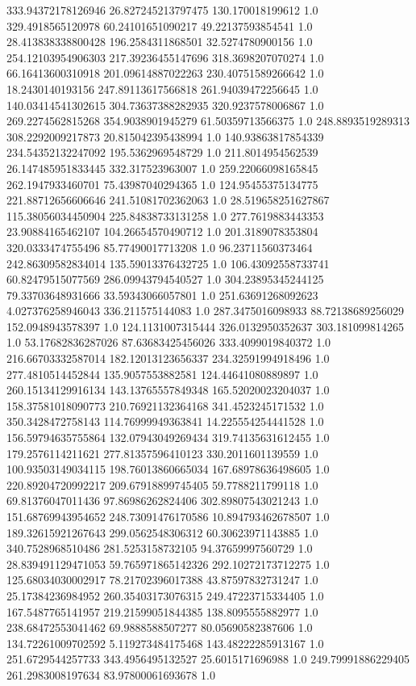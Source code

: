 333.94372178126946	26.827245213797475	130.170018199612	1.0
329.4918565120978	60.24101651090217	49.22137593854541	1.0
28.413838338800428	196.2584311868501	32.5274780900156	1.0
254.12103954906303	217.39236455147696	318.3698207070274	1.0
66.16413600310918	201.09614887022263	230.40751589266642	1.0
18.2430140193156	247.89113617566818	261.94039472256645	1.0
140.03414541302615	304.73637388282935	320.9237578006867	1.0
269.2274562815268	354.9038901945279	61.50359713566375	1.0
248.8893519289313	308.2292009217873	20.815042395438994	1.0
140.93863817854339	234.54352132247092	195.5362969548729	1.0
211.8014954562539	26.147485951833445	332.317523963007	1.0
259.22066098165845	262.1947933460701	75.43987040294365	1.0
124.95455375134775	221.88712656606646	241.51081702362063	1.0
28.519658251627867	115.38056034450904	225.84838733131258	1.0
277.7619883443353	23.90884165462107	104.26654570490712	1.0
201.3189078353804	320.0333474755496	85.77490017713208	1.0
96.23711560373464	242.86309582834014	135.59013376432725	1.0
106.43092558733741	60.82479515077569	286.09943794540527	1.0
304.23895345244125	79.33703648931666	33.59343066057801	1.0
251.63691268092623	4.027376258946043	336.211575144083	1.0
287.3475016098933	88.72138689256029	152.0948943578397	1.0
124.1131007315444	326.0132950352637	303.181099814265	1.0
53.17682836287026	87.63683425456026	333.4099019840372	1.0
216.66703332587014	182.12013123656337	234.32591994918496	1.0
277.4810514452844	135.9057553882581	124.44641080889897	1.0
260.15134129916134	143.13765557849348	165.52020023204037	1.0
158.37581018090773	210.76921132364168	341.4523245171532	1.0
350.3428472758143	114.76999949363841	14.225554254441528	1.0
156.59794635755864	132.07943049269434	319.74135631612455	1.0
179.2576114211621	277.81357596410123	330.2011601139559	1.0
100.93503149034115	198.76013860665034	167.68978636498605	1.0
220.89204720992217	209.67918899745405	59.7788211799118	1.0
69.81376047011436	97.86986262824406	302.89807543021243	1.0
151.68769943954652	248.73091476170586	10.894793462678507	1.0
189.32615921267643	299.0562548306312	60.30623971143885	1.0
340.7528968510486	281.5253158732105	94.37659997560729	1.0
28.839491129471053	59.765971865142326	292.10272173712275	1.0
125.68034030002917	78.21702396017388	43.87597832731247	1.0
25.17384236984952	260.35403173076315	249.47223715334405	1.0
167.5487765141957	219.21599051844385	138.8095555882977	1.0
238.68472553041462	69.9888588507277	80.05690582387606	1.0
134.72261009702592	5.119273484175468	143.48222285913167	1.0
251.6729544257733	343.4956495132527	25.6015171696988	1.0
249.79991886229405	261.2983008197634	83.97800061693678	1.0
